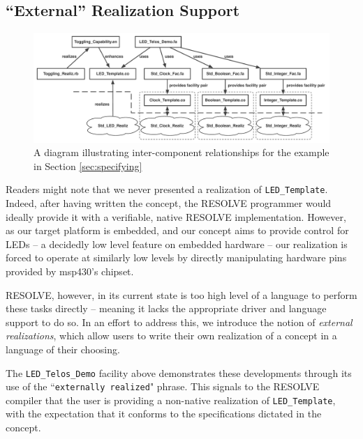 \subsection{``External'' Realization Support}
\label{ssec:external}

\begin{figure}[!htb]
\centering
\includegraphics[scale=.55]{figs/component_graph.pdf}
\caption{A diagram illustrating inter-component relationships for the example in Section \ref{sec:specifying}}
\end{figure}
\label{fig:imp}


Readers might note that we never presented a realization of \texttt{LED\_Template}. Indeed, after having written the concept, the RESOLVE programmer would ideally provide it with a verifiable, native RESOLVE implementation. However, as our target platform is embedded, and our concept aims to provide control for LEDs -- a decidedly low level feature on embedded hardware -- our realization is forced to operate at similarly low levels by directly manipulating hardware pins provided by msp430's chipset. 

RESOLVE, however, in its current state is too high level of a language to perform these tasks directly -- meaning it lacks the appropriate driver and language support to do so. In an effort to address this, we introduce the notion of \textit{external realizations}, which allow users to write their own realization of a concept in a language of their choosing.

The \texttt{LED\_Telos\_Demo} facility above demonstrates these developments through its use of the ``\texttt{externally realized}" phrase. This signals to the RESOLVE compiler that the user is providing a non-native realization of \texttt{LED\_Template}, with the expectation that it conforms to the specifications dictated in the concept. 



